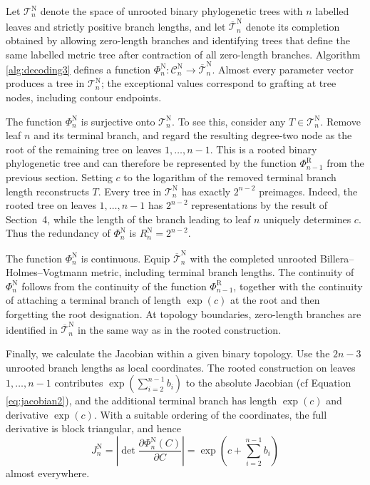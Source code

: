 \documentclass{article}
\begin{document}
Let $\mathcal{T}_n^\mathrm{N}$ denote the space of unrooted binary phylogenetic
trees with $n$ labelled leaves and strictly positive branch lengths, and
let $\overline{\mathcal{T}}_n^\mathrm{N}$ denote its completion obtained by
allowing zero-length branches and identifying trees that define the same
labelled metric tree after contraction of all zero-length branches. Algorithm
\ref{alg:decoding3} defines a function
$
\Phi_n^\mathrm{N}:\mathcal{C}_n^\mathrm{N}\longrightarrow
\overline{\mathcal{T}}_n^\mathrm{N}.
$
Almost every parameter vector produces a tree in $\mathcal{T}_n^\mathrm{N}$; the
exceptional values correspond to grafting at tree nodes, including contour
endpoints.

The function $\Phi_n^\mathrm{N}$ is surjective onto $\mathcal{T}_n^\mathrm{N}$. To see this, consider any
$T\in\mathcal{T}_n^\mathrm{N}$. Remove leaf $n$ and its terminal branch, and regard
the resulting degree-two node as the root of the remaining tree on
leaves $1,\ldots,n-1$. This is a rooted binary phylogenetic tree and can
therefore be represented by the function $\Phi_{n-1}^\mathrm{R}$ from the previous section. Setting $c$
to the logarithm of the removed terminal branch length reconstructs $T$.
Every tree in $\mathcal{T}_n^\mathrm{N}$ has exactly $2^{n-2}$ preimages. Indeed,
the rooted tree on leaves $1,\ldots,n-1$ has $2^{n-2}$ representations by
the result of Section~4, while the length of the branch leading to leaf
$n$ uniquely determines $c$. Thus the redundancy of
$\Phi_n^\mathrm{N}$ is $R_n^\mathrm{N}=2^{n-2}$.

The function $\Phi_n^\mathrm{N}$ is continuous. 
Equip $\overline{\mathcal{T}}_n^\mathrm{N}$ with the completed unrooted
Billera--Holmes--Vogtmann metric, including terminal branch lengths. The
continuity of $\Phi_n^\mathrm{N}$ follows from the continuity of the 
function $\Phi_{n-1}^\mathrm{R}$, together with the continuity of attaching a terminal
branch of length $\exp(c)$ at the root and then forgetting the root
designation. At topology boundaries, zero-length branches are identified in
$\overline{\mathcal{T}}_n^\mathrm{N}$ in the same way as in the rooted
construction.

Finally, we calculate the Jacobian within a given binary topology. 
Use the $2n-3$ unrooted branch lengths as local coordinates. The
rooted construction on leaves $1,\ldots,n-1$ contributes
$
\exp\left(\sum_{i=2}^{n-1} b_i\right)
$
to the absolute Jacobian (cf Equation \ref{eq:jacobian2}), 
and the additional terminal branch has length
$\exp(c)$ and derivative $\exp(c)$. With a suitable ordering of the
coordinates, the full derivative is block triangular, and hence
\begin{equation}
\label{eq:jacobian3}
J_n^\mathrm{N}=\left|
\det\frac{\partial\Phi_n^\mathrm{N}(C)}{\partial C}
\right|
=
\exp\left(c+\sum_{i=2}^{n-1} b_i\right)
\end{equation}
almost everywhere.
\end{document}
